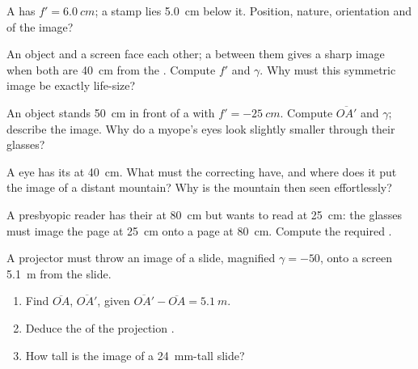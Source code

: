 \begin{exercise}[$\star\star$]\label{exo:g11:lenses-and-eye:7}
A  has $f' = \qty{6.0}{cm}$; a stamp lies \qty{5.0}{cm} below
it. Position, nature, orientation and  of the image?
\end{exercise}

\begin{exercise}[$\star\star$]\label{exo:g11:lenses-and-eye:8}
An object and a screen face each other; a  between them
gives a sharp image when both are \qty{40}{cm} from the . Compute
$f'$ and $\gamma$. Why must this symmetric image be exactly life-size?
\end{exercise}

\begin{exercise}[$\star\star$]\label{exo:g11:lenses-and-eye:9}
An object stands \qty{50}{cm} in front of a  with
$f' = \qty{-25}{cm}$. Compute $\overline{OA'}$ and $\gamma$; describe
the image. Why do a myope's eyes look slightly smaller through their
glasses?
\end{exercise}

\begin{exercise}[$\star\star$]\label{exo:g11:lenses-and-eye:10}
A  eye has its  at \qty{40}{cm}. What  must the
correcting  have, and where does it put the image of a distant
mountain? Why is the mountain then seen effortlessly?
\end{exercise}

\begin{exercise}[$\star\star$]\label{exo:g11:lenses-and-eye:11}
A presbyopic reader has their  at \qty{80}{cm} but wants to
read at \qty{25}{cm}: the glasses must image the page at \qty{25}{cm}
onto a  page at \qty{80}{cm}. Compute the required .
\end{exercise}

\begin{exercise}[$\star\star\star$]\label{exo:g11:lenses-and-eye:12}
A projector must throw an image of a slide, magnified $\gamma = -50$,
onto a screen \qty{5.1}{m} from the slide.
\begin{enumerate}
  \item Find $\overline{OA}$, $\overline{OA'}$, given
        $\overline{OA'} - \overline{OA} = \qty{5.1}{m}$.
  \item Deduce the  of the projection .
  \item How tall is the image of a \qty{24}{mm}-tall slide?
\end{enumerate}
\end{exercise}

